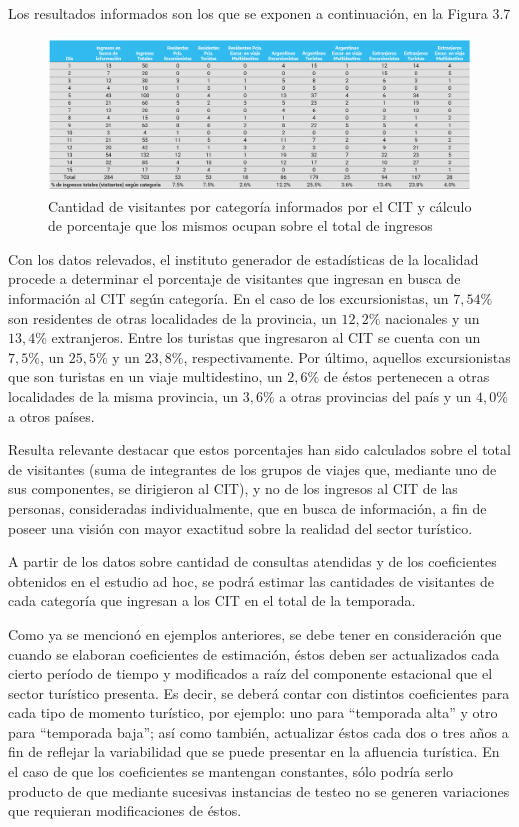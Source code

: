 \documentclass[
]{book}
\begin{document}
Los resultados informados son los que se exponen a continuación, en la Figura 3.7

\begin{figure}

{\centering \includegraphics[width=1\linewidth]{imagenes/figura09} 

}

\caption{Cantidad de visitantes por categoría informados por el CIT y cálculo de porcentaje que los mismos ocupan sobre el total de ingresos}\label{fig:cantidaddevisitantes}
\end{figure}

Con los datos relevados, el instituto generador de estadísticas de la localidad procede a determinar el porcentaje de visitantes que ingresan en busca de información al CIT según categoría. En el caso de los excursionistas, un \(7,54\%\) son residentes de otras localidades de la provincia, un \(12,2\%\) nacionales y un \(13,4\%\) extranjeros. Entre los turistas que ingresaron al CIT se cuenta con un \(7,5\%\), un \(25,5\%\) y un \(23,8\%\), respectivamente. Por último, aquellos excursionistas que son turistas en un viaje multidestino, un \(2,6\%\) de éstos pertenecen a otras localidades de la misma provincia, un \(3,6\%\) a otras provincias del país y un \(4,0\%\) a otros países.

Resulta relevante destacar que estos porcentajes han sido calculados sobre el total de visitantes (suma de integrantes de los grupos de viajes que, mediante uno de sus componentes, se dirigieron al CIT), y no de los ingresos al CIT de las personas, consideradas individualmente, que en busca de información, a fin de poseer una visión con mayor exactitud sobre la realidad del sector turístico.

A partir de los datos sobre cantidad de consultas atendidas y de los coeficientes obtenidos en el estudio ad hoc, se podrá estimar las cantidades de visitantes de cada categoría que ingresan a los CIT en el total de la temporada.

Como ya se mencionó en ejemplos anteriores, se debe tener en consideración que cuando se elaboran coeficientes de estimación, éstos deben ser actualizados cada cierto período de tiempo y modificados a raíz del componente estacional que el sector turístico presenta. Es decir, se deberá contar con distintos coeficientes para cada tipo de momento turístico, por ejemplo: uno para ``temporada alta'' y otro para ``temporada baja''; así como también, actualizar éstos cada dos o tres años a fin de reflejar la variabilidad que se puede presentar en la afluencia turística. En el caso de que los coeficientes se mantengan constantes, sólo podría serlo producto de que mediante sucesivas instancias de testeo no se generen variaciones que requieran modificaciones de éstos.
\end{document}
